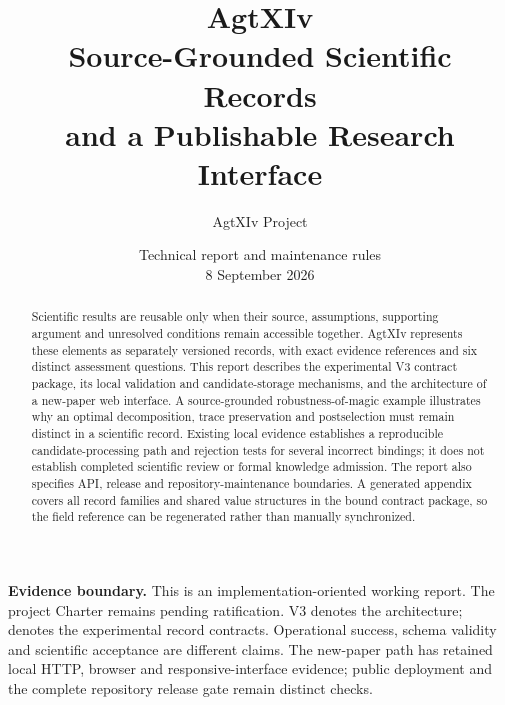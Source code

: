 \documentclass[10pt,a4paper]{article}
\title{\color{ink}\bfseries AgtXIv\\[5pt]\Large Source-Grounded Scientific Records\\and a Publishable Research Interface}
\author{AgtXIv Project}
\date{Technical report and maintenance rules\\8 September 2026}
\newcommand{\boundary}[1]{\par\smallskip\noindent\colorbox{wash}{\parbox{\dimexpr\linewidth-2\fboxsep\relax}{\small\textbf{Evidence boundary.} #1}}\par\smallskip}
\begin{document}
\maketitle
\thispagestyle{empty}
\begin{abstract}
Scientific results are reusable only when their source, assumptions, supporting argument and unresolved conditions remain accessible together. AgtXIv represents these elements as separately versioned records, with exact evidence references and six distinct assessment questions. This report describes the experimental V3 contract package, its local validation and candidate-storage mechanisms, and the architecture of a new-paper web interface. A source-grounded robustness-of-magic example illustrates why an optimal decomposition, trace preservation and postselection must remain distinct in a scientific record. Existing local evidence establishes a reproducible candidate-processing path and rejection tests for several incorrect bindings; it does not establish completed scientific review or formal knowledge admission. The report also specifies API, release and repository-maintenance boundaries. A generated appendix covers all \RecordFamilyCount{} record families and \SharedTypeCount{} shared value structures in the bound contract package, so the field reference can be regenerated rather than manually synchronized.
\end{abstract}

\boundary{This is an implementation-oriented working report. The project Charter remains pending ratification. V3 denotes the architecture; \ContractVersion{} denotes the experimental record contracts. Operational success, schema validity and scientific acceptance are different claims. The new-paper path has retained local HTTP, browser and responsive-interface evidence; public deployment and the complete repository release gate remain distinct checks.}

\clearpage
\tableofcontents
\newpage








\begingroup\small
\renewcommand{\bibsection}{\paragraph{Reference}}


\endgroup
\clearpage
\appendix

\end{document}
